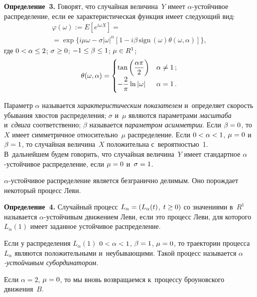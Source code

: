 \begin{multicols}{2}
\smallskip

\noindent
\textbf{Определение~3.} 
Говорят, что случайная величина~$Y$ имеет $\alpha$-устой\-чи\-вое распределение, 
если ее характеристическая функция имеет следующий вид:
\begin{multline*}
\varphi (\omega ) := E\left[ e^{i \omega X} \right] ={}\\
{}= \exp \{
i\mu\omega - \sigma |\omega |^{\alpha} [1 - i \beta \,\mathrm{sign}\, (\omega )
\theta (\omega , \alpha )] \},
\end{multline*}
где $0< \alpha \hm\leq 2$; $\sigma\hm\geq 0$;
$-1 \hm\leq \beta \hm\leq 1$; $\mu\hm\in R^1$;
$$
\theta (\omega , \alpha ) =
\begin{cases}
\tan \left( \displaystyle\frac{\displaystyle \alpha \pi \mathstrut}{\displaystyle 2\mathstrut} \right)& \alpha \not= 1\,; \\
-\displaystyle\frac{\displaystyle 2\mathstrut}{\displaystyle \pi\mathstrut} \ln |\omega |& \alpha =1\,.
\end{cases}
$$




Параметр $\alpha$ называется {\it характеристическим показателем} 
и~определяет скорость убывания хвостов распределения;
$\sigma$ и~$\mu$ являются параметрами {\it масштаба } и~{\it сдвига} соответственно; 
$\beta$
называется {\it параметром асимметрии}. Если $\beta \hm=0$, то $X$ имеет 
симметричное относительно~$\mu$ распределение.
Если $0\hm<\alpha \hm<1$, $\mu \hm=0$ и~$\beta\hm =1$, то случайная величина~$X$ 
положительна с~вероятностью~1. В~дальнейшем будем говорить, что случайная
величина~$Y$ имеет стандартное $\alpha$-устой\-чи\-вое распределение, если 
$\mu \hm=0$ и~$\sigma \hm= 1$.

$\alpha$-устойчивое распределение является безгранично делимым. Оно порождает 
некоторый процесс Леви.

\smallskip

\noindent
\textbf{Определение~4.} 
Случайный процесс $L_{\alpha} \hm= (L_{\alpha} (t)$, $t\hm\geq 0)$ со значениями 
в~$R^1$ называется $\alpha$-устой\-чи\-вым движением Леви,
если это процесс Леви, для которого $L_{\alpha} (1)$ имеет заданное 
устойчивое распределение.


\smallskip

Если у распределения $L_{\alpha} (1)$ $0\hm<\alpha \hm<1$, $\beta \hm=1$, $\mu \hm=0$, 
то траектории процесса~$L_{\alpha}$ являются положительными и~неубывающими.
Такой процесс называется {\it $\alpha$-устой\-чи\-вым субординатором}.

Если $\alpha =2$, $\mu \hm=0$, то мы вновь возвращаемся к~процессу 
броуновского движения~$B$.


\end{multicols}
